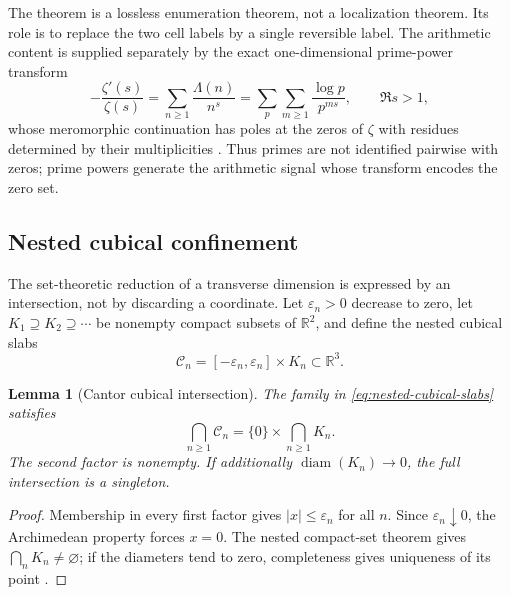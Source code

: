 \documentclass[11pt]{amsart}
\newtheorem{lemma}[theorem]{Lemma}
\theoremstyle{definition}
\theoremstyle{remark}
\begin{document}
The theorem is a lossless enumeration theorem, not a localization theorem.  Its role is to
replace the two cell labels by a single reversible label.  The arithmetic content is supplied
separately by the exact one-dimensional prime-power transform
\begin{equation}\label{eq:prime-power-line}
 -\frac{\zeta'(s)}{\zeta(s)}
 =\sum_{n\ge1}\frac{\Lambda(n)}{n^s}
 =\sum_p\sum_{m\ge1}\frac{\log p}{p^{ms}},
 \qquad \Re s>1,
\end{equation}
whose meromorphic continuation has poles at the zeros of $\zeta$ with residues determined by
their multiplicities \cite{Titchmarsh}.  Thus primes are not identified pairwise with zeros;
prime powers generate the arithmetic signal whose transform encodes the zero set.

\subsection{Nested cubical confinement}
The set-theoretic reduction of a transverse dimension is expressed by an intersection, not by
discarding a coordinate.  Let $\varepsilon_n>0$ decrease to zero, let
$K_1\supseteq K_2\supseteq\cdots$ be nonempty compact subsets of $\mathbb R^2$, and define
the nested cubical slabs
\begin{equation}\label{eq:nested-cubical-slabs}
 \mathcal C_n=[-\varepsilon_n,\varepsilon_n]\times K_n
 \subset\mathbb R^3.
\end{equation}

\begin{lemma}[Cantor cubical intersection]\label{lem:cantor-cubical}
The family in \eqref{eq:nested-cubical-slabs} satisfies
\begin{equation}\label{eq:cubical-intersection}
 \bigcap_{n\ge1}\mathcal C_n
 =\{0\}\times\bigcap_{n\ge1}K_n.
\end{equation}
The second factor is nonempty.  If additionally $\operatorname{diam}(K_n)\to0$, the full
intersection is a singleton.
\end{lemma}

\begin{proof}
Membership in every first factor gives $|x|\le\varepsilon_n$ for all $n$.  Since
$\varepsilon_n\downarrow0$, the Archimedean property forces $x=0$.  The nested compact-set
theorem gives $\bigcap_nK_n\ne\varnothing$; if the diameters tend to zero, completeness gives
uniqueness of its point \cite{Rudin}.
\end{proof}
\end{document}
